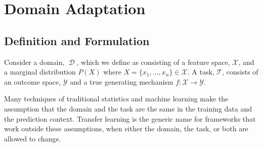 \documentclass[a4paper,12pt]{article}
\DeclareMathOperator*{\D}{\mathcal{D}}
\begin{document}






\section{Domain Adaptation}

\subsection{Definition and Formulation}

Consider a domain, $\D$, which we define as consisting of a feature space, $\mathcal{X}$, and a marginal distribution $P(X)$ where $X = \{x_1,\ldots,x_n\} \in \mathcal{X}$. A task, $\mathcal{T}$, consists of an outcome space, $\mathcal{Y}$ and a true generating mechanism $f: \mathcal{X} \rightarrow \mathcal{Y}$.

Many techniques of traditional statistics and machine learning make the assumption that the domain and the task are the same in the training data and the prediction context. Transfer learning is the generic name for frameworks that work outside these assumptions, when either the domain, the task, or both are allowed to change. 
\end{document}
